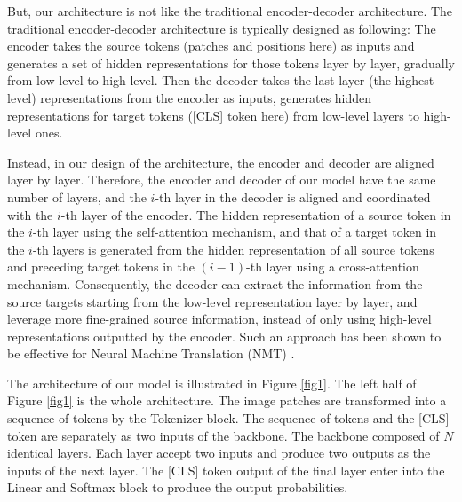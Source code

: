 \documentclass[anon,12pt]{colt2024} %
\begin{document}
But, our architecture is not like the traditional encoder-decoder architecture.
The traditional encoder-decoder architecture is typically designed as following:
The encoder takes the source tokens (patches and positions here) as inputs and generates a set of hidden representations for those tokens layer by layer, gradually from low level to high level. Then the decoder takes the last-layer (the highest level) representations from the encoder as inputs, generates hidden representations for target tokens ([CLS] token here) from low-level layers to high-level ones.


Instead, in our design of the architecture, the encoder and decoder are aligned layer by layer.
Therefore, the encoder and decoder of our model have the same number of layers, and the $i$-th layer in the decoder is aligned and coordinated with the $i$-th layer of the encoder.
The hidden representation of a source token in the $i$-th layer using the self-attention mechanism, and that of a target token in the $i$-th layers is generated from the hidden representation of all source tokens and preceding target tokens in the $(i-1)$-th layer using a cross-attention mechanism.
Consequently, the decoder can extract the information from the source targets starting from the low-level representation layer by layer, and leverage more fine-grained source information, instead of only using high-level representations outputted by the encoder. Such an approach has been shown to be effective for Neural Machine Translation (NMT) \cite{he2018layer}.

The architecture of our model is illustrated in Figure \ref{fig1}.
The left half of Figure \ref{fig1} is the whole architecture. The image patches are transformed into a sequence of tokens by the Tokenizer block. The sequence of tokens and the [CLS] token are separately as two inputs of the backbone. The backbone composed of $N$ identical layers. Each layer accept two inputs and produce two outputs as the inputs of the next layer. The [CLS] token output of the final layer enter into the Linear and Softmax block to produce the output probabilities.
\end{document}
